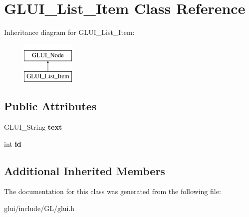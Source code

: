 \hypertarget{classGLUI__List__Item}{\section{G\-L\-U\-I\-\_\-\-List\-\_\-\-Item Class Reference}
\label{classGLUI__List__Item}
}
Inheritance diagram for G\-L\-U\-I\-\_\-\-List\-\_\-\-Item\-:\begin{figure}[H]
\begin{center}
\leavevmode
\includegraphics[height=2.000000cm]{classGLUI__List__Item}
\end{center}
\end{figure}
\subsection*{Public Attributes}
\begin{DoxyCompactItemize}
\item 
\hypertarget{classGLUI__List__Item_a8d7db7c4b7dd085352de5d1a6b849da2}{G\-L\-U\-I\-\_\-\-String {\bfseries text}}\label{classGLUI__List__Item_a8d7db7c4b7dd085352de5d1a6b849da2}

\item 
\hypertarget{classGLUI__List__Item_a329b7a460a0e449e4bb0bdc2e8ba519c}{int {\bfseries id}}\label{classGLUI__List__Item_a329b7a460a0e449e4bb0bdc2e8ba519c}

\end{DoxyCompactItemize}
\subsection*{Additional Inherited Members}


The documentation for this class was generated from the following file\-:\begin{DoxyCompactItemize}
\item 
glui/include/\-G\-L/glui.\-h\end{DoxyCompactItemize}
